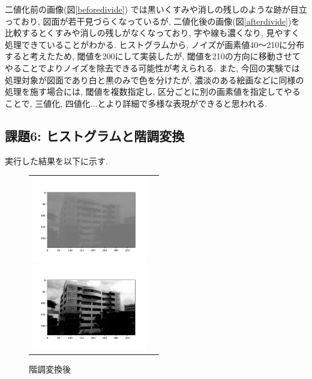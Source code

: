 \documentclass[a4paper,11pt,uplatex, titlepage]{jsarticle}
\begin{document}
二値化前の画像(図\ref{beforedivide}) では黒いくすみや消しの残しのような跡が目立っており, 図面が若干見づらくなっているが,
二値化後の画像(図\ref{afterdivide})を比較するとくすみや消しの残しがなくなっており, 字や線も濃くなり, 見やすく処理できていることがわかる.
ヒストグラムから, ノイズが画素値40〜210に分布すると考えたため, 閾値を200にして実装したが,
閾値を210の方向に移動させてやることでよりノイズを除去できる可能性が考えられる.
また, 今回の実験では処理対象が図面であり白と黒のみで色を分けたが, 濃淡のある絵画などに同様の処理を施す場合には,
閾値を複数指定し, 区分ごとに別の画素値を指定してやることで, 三値化, 四値化$\dots$とより詳細で多様な表現ができると思われる.

\subsection{課題6: ヒストグラムと階調変換}
実行した結果を以下に示す.
\begin{figure}[H]
  \begin{tabular}{cc}
    \begin{minipage}{0.5\hsize}
      \begin{center}
        \includegraphics[width = 5cm]{pic/kadai6.png}
        \caption{階調変換前}
        \label{beforevivid}
      \end{center}
    \end{minipage}

    \begin{minipage}{0.5\hsize}
      \begin{center}
        \includegraphics[width = 5cm]{pic/kadai6pic.png}
        \caption{階調変換後}
        \label{aftervivid}
      \end{center}
    \end{minipage}
  \end{tabular}
\end{figure}
\end{document}
